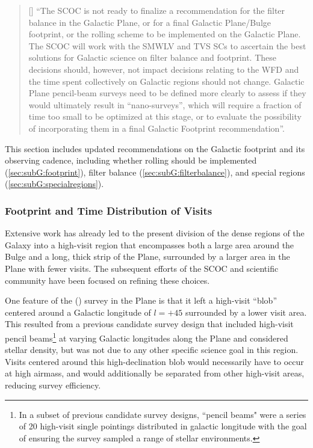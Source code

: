 \begin{quote}
    [] ``The SCOC is not ready to finalize a recommendation for the
filter balance in the Galactic Plane, or for a final Galactic Plane/Bulge footprint, or the rolling scheme to be implemented on the Galactic Plane. The SCOC will work with the SMWLV and TVS SCs to ascertain the best solutions for Galactic science on filter balance and footprint. These decisions should, however, not impact decisions relating to the WFD and the time spent collectively on Galactic regions should not change.
Galactic Plane pencil-beam surveys need to be defined more clearly to assess if they would ultimately result in ``nano-surveys'', which will require a fraction of time too small to be optimized at this stage, or to evaluate the possibility of incorporating them in a final Galactic Footprint recommendation''.
\end{quote}

This section includes updated recommendations on the Galactic footprint and its observing cadence, including whether rolling should be implemented (\autoref{sec:subG:footprint}), filter balance (\autoref{sec:subG:filterbalance}), and special regions (\autoref{sec:subG:specialregions}).

\subsubsection{Footprint and Time Distribution of Visits}\label{sec:subG:footprint}

Extensive work has already led to the present division of the dense regions of the Galaxy into a high-visit region that encompasses both a large area around the Bulge and a long, thick strip of the Plane, surrounded by a larger area in the Plane with fewer visits. %
The subsequent efforts of the SCOC and scientific community have been focused on refining these choices.

One feature of the  () survey in the Plane is that it left a high-visit ``blob'' centered around a Galactic longitude of $l=+45$ surrounded by a lower visit area. This resulted from a previous candidate survey design that included high-visit pencil beams\footnote{In a subset of previous candidate survey designs, ``pencil beams" were a series of 20 high-visit single pointings distributed in galactic longitude with the goal of ensuring the survey sampled a range of stellar environments.} at varying Galactic longitudes along the Plane and considered stellar density, but was not due to any other specific science goal in this region. Visits centered around this high-declination blob would necessarily have to occur at high airmass, and would additionally be separated from other high-visit areas, reducing survey efficiency.

